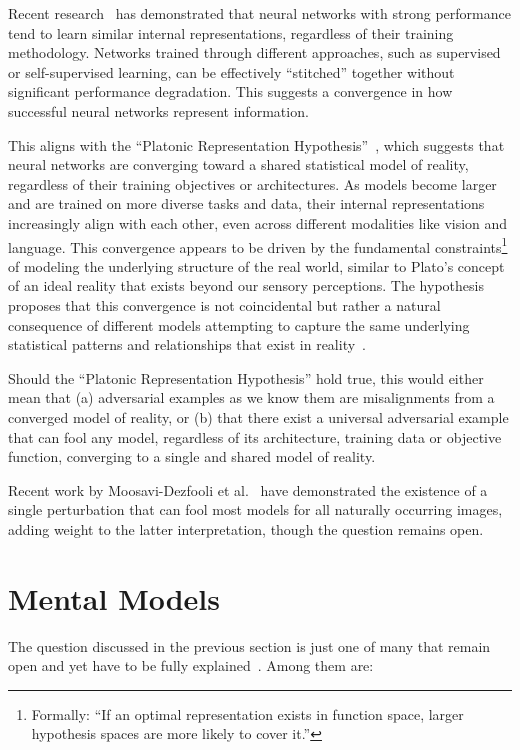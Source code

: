 \documentclass[a4paper, oneside]{discothesis}
\begin{document}
Recent research~\cite{bansal2021revisiting} has demonstrated that neural networks with strong performance tend to learn similar internal representations, regardless of their training methodology. Networks trained through different approaches, such as supervised or self-supervised learning, can be effectively ``stitched'' together without significant performance degradation. This suggests a convergence in how successful neural networks represent information.

This aligns with the ``Platonic Representation Hypothesis''~\cite{huh2024platonic}, which suggests that neural networks are converging toward a shared statistical model of reality, regardless of their training objectives or architectures. As models become larger and are trained on more diverse tasks and data, their internal representations increasingly align with each other, even across different modalities like vision and language. This convergence appears to be driven by the fundamental constraints\footnote{Formally: ``If an optimal representation exists in function space, larger hypothesis spaces are more likely to cover it.''} of modeling the underlying structure of the real world, similar to Plato's concept of an ideal reality that exists beyond our sensory perceptions. The hypothesis proposes that this convergence is not coincidental but rather a natural consequence of different models attempting to capture the same underlying statistical patterns and relationships that exist in reality~\cite{huh2024platonic}. 

Should the ``Platonic Representation Hypothesis'' hold true, this would either mean that (a) adversarial examples as we know them are misalignments from a converged model of reality, or (b) that there exist a universal adversarial example that can fool any model, regardless of its architecture, training data or objective function, converging to a single and shared model of reality.

Recent work by Moosavi-Dezfooli et al.\ \cite{moosavi2017universal} have demonstrated the existence of a single perturbation that can fool most models for all naturally occurring images, adding weight to the latter interpretation, though the question remains open.

\section{Mental Models}

The question discussed in the previous section is just one of many that remain open and yet have to be fully explained~\cite{shamir2021dimpled}. Among them are:
\end{document}
